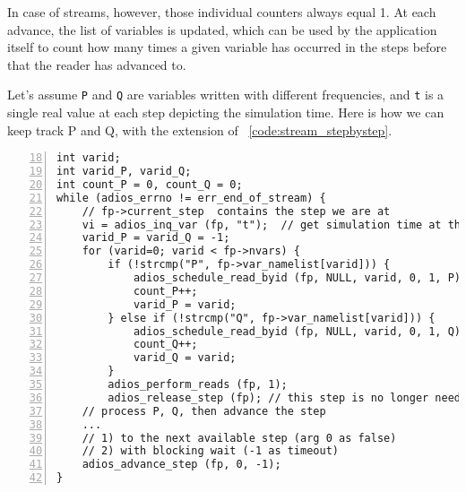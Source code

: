 In case of streams, however, those individual counters always equal 1. At each advance, the list of variables is updated, which can be used by the application itself to count how many times a given variable has occurred in the steps before that the reader has advanced to. 

Let's assume \verb+P+ and \verb+Q+ are variables written with different frequencies, and \verb+t+ is a single real value at each step depicting the simulation time. Here is how we can keep track P and Q, with the extension of  \lstlistingname~\ref{code:stream_stepbystep}.

\begin{lstlisting}[numbers=left, numberstyle=\color{gray}, stepnumber=2,firstnumber=18,
                             caption={Processing varying set of variables in a stream},  label=code:stream_variable_stepping]
int varid;
int varid_P, varid_Q;
int count_P = 0, count_Q = 0;
while (adios_errno != err_end_of_stream) {
    // fp->current_step  contains the step we are at
    vi = adios_inq_var (fp, "t");  // get simulation time at this step
    varid_P = varid_Q = -1; 
    for (varid=0; varid < fp->nvars) {
        if (!strcmp("P", fp->var_namelist[varid])) {
            adios_schedule_read_byid (fp, NULL, varid, 0, 1, P);
            count_P++;
            varid_P = varid;
        } else if (!strcmp("Q", fp->var_namelist[varid])) {
            adios_schedule_read_byid (fp, NULL, varid, 0, 1, Q);
            count_Q++;
            varid_Q = varid;
        }
        adios_perform_reads (fp, 1);   
        adios_release_step (fp); // this step is no longer needed
    // process P, Q, then advance the step
    ...
    // 1) to the next available step (arg 0 as false) 
    // 2) with blocking wait (-1 as timeout)
    adios_advance_step (fp, 0, -1);
}
\end{lstlisting}

